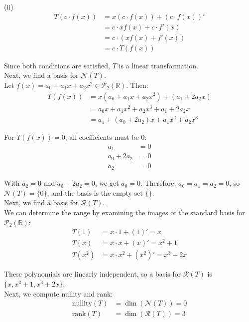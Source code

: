 \documentclass{article}
\begin{document}
(ii)
\begin{align*}
    T(c \cdot f(x)) &= x(c \cdot f(x)) + (c \cdot f(x))' \\
    &= c \cdot xf(x) + c \cdot f'(x) \\
    &= c \cdot (xf(x) + f'(x)) \\
    &= c \cdot T(f(x))
\end{align*}

Since both conditions are satisfied, $T$ is a linear transformation. \\

Next, we find a basis for $\mathcal{N}(T)$. \\

Let $f(x) = a_0 + a_1x + a_2x^2 \in \mathcal{P}_2(\mathbb{R})$. Then:
\begin{align*}
    T(f(x)) &= x(a_0 + a_1x + a_2x^2) + (a_1 + 2a_2x) \\
    &= a_0x + a_1x^2 + a_2x^3 + a_1 + 2a_2x \\
    &= a_1 + (a_0 + 2a_2)x + a_1x^2 + a_2x^3
\end{align*}

For $T(f(x)) = 0$, all coefficients must be 0:
\begin{align*}
    a_1 &= 0 \\
    a_0 + 2a_2 &= 0 \\
    a_2 &= 0
\end{align*}

With $a_2 = 0$ and $a_0 + 2a_2 = 0$, we get $a_0 = 0$.
Therefore, $a_0 = a_1 = a_2 = 0$, so $\mathcal{N}(T) = \{0\}$, and the basis is the empty set $\{\}$. \\

Next, we find a basis for $\mathcal{R}(T)$. \\

We can determine the range by examining the images of the standard basis for $\mathcal{P}_2(\mathbb{R})$:
\begin{align*}
    T(1) &= x \cdot 1 + (1)' = x \\
    T(x) &= x \cdot x + (x)' = x^2 + 1 \\
    T(x^2) &= x \cdot x^2 + (x^2)' = x^3 + 2x
\end{align*}

These polynomials are linearly independent, so a basis for $\mathcal{R}(T)$ is $\{x, x^2 + 1, x^3 + 2x\}$. \\

Next, we compute nullity and rank:
\begin{align*}
    \text{nullity}(T) &= \dim(\mathcal{N}(T)) = 0 \\
    \text{rank}(T) &= \dim(\mathcal{R}(T)) = 3
\end{align*}
\end{document}
